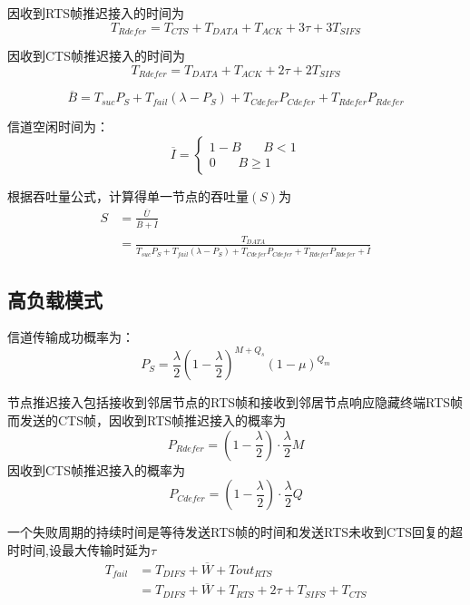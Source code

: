 因收到RTS帧推迟接入的时间为
\begin{equation}
T_{Rdefer}=T_{CTS}+T_{DATA}+T_{ACK}+3\tau+3T_{SIFS}
\end{equation}

因收到CTS帧推迟接入的时间为
\begin{equation}
T_{Rdefer}=T_{DATA}+T_{ACK}+2\tau+2T_{SIFS}
\end{equation}

\begin{equation}
\overline B=T_{suc}P_S+T_{fail}(\lambda-P_S )+ T_{Cdefer}P_{Cdefer}+T_{Rdefer}P_{Rdefer}
\end{equation}

信道空闲时间为：
\begin{equation}
\overline I=\left\{
\begin{aligned}
1-B \ \ \ \ \ \ \ \ B<1\\
0\ \ \ \ \ \ \ \    B\ge 1
\end{aligned}
\right.
\end{equation}

根据吞吐量公式，计算得单一节点的吞吐量$(S)$为
\begin{equation}
\begin{aligned}
S&=\frac{\overline U}{\overline B+\overline I}\\&=\frac{T_{DATA}}{ T_{suc}P_S+T_{fail}(\lambda-P_S )+ T_{Cdefer}P_{Cdefer}+T_{Rdefer}P_{Rdefer}+\overline I}
\end{aligned}
\end{equation}

\subsection {高负载模式}

信道传输成功概率为：
\begin{equation}
P_S=\frac{\lambda}{2}(1-\frac{\lambda}{2})^{M+Q_s}(1-\mu)^{Q_m}
\end{equation}

节点推迟接入包括接收到邻居节点的RTS帧和接收到邻居节点响应隐藏终端RTS帧而发送的CTS帧，因收到RTS帧推迟接入的概率为
\begin{equation}
P_{Rdefer}=(1-\frac{\lambda}{2})\cdot\frac{\lambda}{2} M
\end{equation}
因收到CTS帧推迟接入的概率为
\begin{equation}
P_{Cdefer}=(1-\frac{\lambda}{2})\cdot\frac{\lambda}{2} Q
\end{equation}

一个失败周期的持续时间是等待发送RTS帧的时间和发送RTS未收到CTS回复的超时时间,设最大传输时延为$\tau$
\begin{equation}
\begin{aligned}
T_{fail}&=T_{DIFS}+\overline W+Tout_{RTS}\\
&=T_{DIFS}+\overline W+T_{RTS}+2\tau+T_{SIFS}+T_{CTS}
\end{aligned}
\end{equation}

